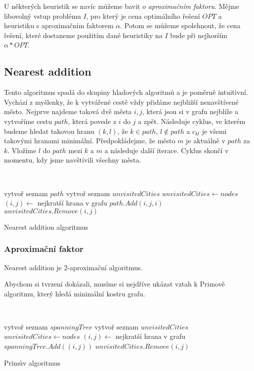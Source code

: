 \documentclass[
  biblatex,
  figures=false,
  glossaries,
  index
]{kidiplom}
\begin{document}
U některých heuristik se navíc můžeme bavit o \textit{aproximačním faktoru}. Mějme libovolný vstup problému $I$, pro který je cena optimálního řešení $OPT$ a heuristiku s aproximačním faktorem $\alpha$. Potom se můžeme spolehnout, že cena řešení, které dostaneme použitím dané heuristiky na $I$ bude při nejhorším $\alpha * OPT$.

\subsection{Nearest addition}
	Tento algoritmus spadá do skupiny hladových algoritmů a je poměrně intuitivní. Vychází z myšlenky, že k vytvářené cestě vždy přidáme nejbližší nenavštívené město. Nejprve najdeme taková dvě města $i, j$, která jsou si v grafu nejblíže a vytvoříme cestu $path$, která povede z $i$ do $j$ a zpět. Následuje cyklus, ve kterém budeme hledat takovou hranu $(k, l)$, že $k \in path$, $l \notin path$ a $c_{kl}$ je všemi takovými hranami minimální. Předpokládejme, že město $m$ je aktuálně v $path$ za $k$. Vložíme $l$ do $path$ mezi $k$ a $m$ a následuje další iterace. Cyklus skončí v momentu, kdy jsme navštívili všechny města.\newline
	
{\SetAlgoNoLine\
\begin{algorithm}[H]
vytvoř seznam $path$\;
vytvoř seznam $unvisitedCities$\;
$unvisitedCities \leftarrow nodes$\;
$(i, j) \leftarrow $ nejkratší hrana v grafu\;
$path.Add(i, j, i)$\;
$unvisitedCities.Remove(i, j)$\;

\caption{Nearest addition algoritmus}
\end{algorithm}}

\subsubsection{Aproximační faktor}
\begin{theorem}
Nearest addition  je 2-aproximační algoritmus.
\end{theorem}

Abychom si tvrzení dokázali, musíme si nejdříve ukázat vztah k Primově algoritmu, který hledá minimální kostru grafu.\newline

{\SetAlgoNoLine\
\begin{algorithm}[H]
vytvoř seznam $spanningTree$\;
vytvoř seznam $unvisitedCities$\;
$unvisitedCities \leftarrow nodes$\;
$(i, j) \leftarrow $ nejkratší hrana v grafu\;
$spanningTree.Add((i, j))$\;
$unvisitedCities.Remove(i, j)$\;

\caption{Primův algoritmus}
\end{algorithm}}\leavevmode\newline
\end{document}
